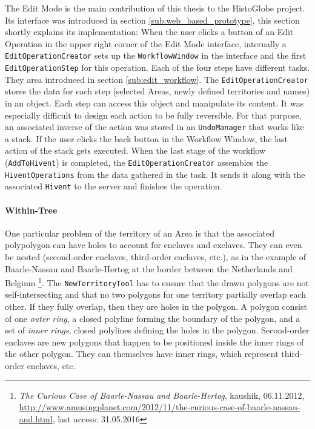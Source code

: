 The Edit Mode is the main contribution of this thesis to the HistoGlobe project. Its interface was introduced in section \ref{sub:web_based_prototype}, this section shortly explains its implementation: When the user clicks a button of an Edit Operation in the upper right corner of the Edit Mode interface, internally a \texttt{EditOperationCreator} sets up the \texttt{WorkflowWindow} in the interface and the first \texttt{EditOperationStep} for this operation. Each of the four steps have different tasks. They area introduced in section \ref{sub:edit_workflow}. The \texttt{EditOperationCreator} stores the data for each step (selected Areas, newly defined territories and names) in an object. Each step can access this object and manipulate its content. It was especially difficult to design each action to be fully reversible. For that purpose, an associated inverse of the action was stored in an \texttt{UndoManager} that works like a stack. If the user clicks the back button in the Workflow Window, the last action of the stack gets executed. When the last stage of the workflow (\texttt{AddToHivent}) is completed, the \texttt{EditOperationCreator} assembles the \texttt{HiventOperations} from the data gathered in the task. It sends it along with the associated \texttt{Hivent} to the server and finishes the operation.


\paragraph{Within-Tree} %
\label{par:within_tree}

One particular problem of the territory of an Area is that the associated polypolygon can have holes to account for enclaves and exclaves. They can even be nested (second-order enclaves, third-order enclaves, etc.), as in the example of Baarle-Nassau and Baarle-Hertog at the border between the Netherlands and Belgium
\footnote{
  \emph{The Curious Case of Baarle-Nassau and Baarle-Hertog},
  kaushik, 06.11.2012,
  \url{http://www.amusingplanet.com/2012/11/the-curious-case-of-baarle-nassau-and.html},
  last access: 31.05.2016
}.
The \texttt{NewTerritoryTool} has to ensure that the drawn polygons are not self-intersecting and that no two polygons for one territory partially overlap each other. If they fully overlap, then they are holes in the polygon. A polygon consist of one \emph{outer ring}, a closed polyline forming the boundary of the polygon, and a set of \emph{inner rings}, closed polylines defining the holes in the polygon. Second-order enclaves are new polygons that happen to be positioned inside the inner rings of the other polygon. They can themselves have inner rings, which represent third-order enclaves, etc.


